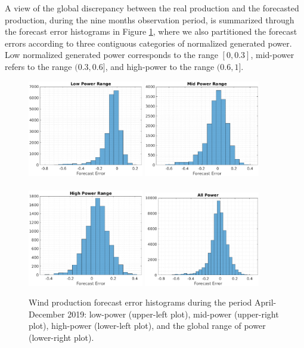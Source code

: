 \documentclass[11pt]{article}
\theoremstyle{definition}
\begin{document}
A view of the global discrepancy between the real production and the forecasted production, during the nine months observation period, is summarized through the forecast error histograms in Figure \ref{fig:data_curtailing}, where we also partitioned the forecast errors according to three contiguous categories of normalized generated power. Low normalized generated power corresponds to the range $[0,0.3]$, mid-power refers to the range $(0.3,0.6]$, and high-power to the range $(0.6,1]$.

\begin{figure}[H]
\centering
\includegraphics[width=0.45\textwidth]{plots/LP_6.eps}
\includegraphics[width=0.45\textwidth]{plots/MP_6.eps}\\
\quad\\
\includegraphics[width=0.45\textwidth]{plots/HP_6.eps}
\includegraphics[width=0.45\textwidth]{plots/AP_6.eps}
\caption{Wind production forecast error histograms during the period April-December 2019: low-power (upper-left plot), mid-power (upper-right plot), high-power (lower-left plot), and the global range of power (lower-right plot).}
  \label{fig:data_curtailing}
\end{figure}
\end{document}
